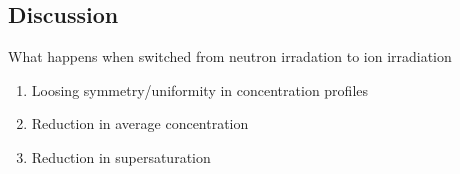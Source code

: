 \documentclass[a4paper]{article}
\begin{document}
%
%
%
%
  \subsection{Discussion} \hspace{10pt}
  What happens when switched from neutron irradation to ion irradiation
  \begin{enumerate}
    \item Loosing symmetry/uniformity in concentration profiles
    \item Reduction in average concentration
    \item Reduction in supersaturation
  \end{enumerate}
\end{document}
